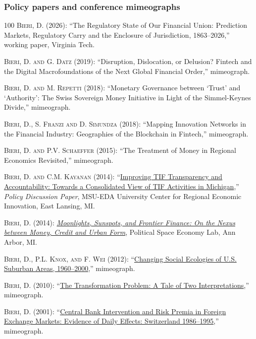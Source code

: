 \documentclass[letter,11pt]{article}
\begin{document}
\subsubsection*{Policy papers and conference mimeographs}
\begingroup
\renewcommand{\section}[2]{}
\begin{thebibliography}{100}
\textsc{Bieri, D.} (2026): \enquote{The Regulatory State of Our Financial Union: Prediction Markets, Regulatory Carry and the Enclosure of Jurisdiction, 1863--2026,} working paper, Virginia Tech.

\textsc{Bieri, D.  {\small and} G. Datz} (2019): \enquote{Disruption, Dislocation, or Delusion? Fintech and the Digital Macrofoundations of the Next Global Financial Order,} mimeograph.

\textsc{Bieri, D. {\small and} M. Repetti} (2018):
\noindent\enquote{Monetary Governance between \enquote{Trust} and \enquote{Authority}: The Swiss Sovereign Money Initiative in Light of the Simmel-Keynes Divide,} mimeograph.

\textsc{Bieri, D., S. Franzi  {\small and} D. Simundza} (2018): \enquote{Mapping Innovation Networks in the Financial Industry: Geographies of the Blockchain in Fintech,} mimeograph.

\textsc{Bieri, D. {\small and} P.V. Schaeffer} (2015):
\noindent\enquote{The Treatment of Money in Regional Economics Revisited,} mimeograph.

\textsc{Bieri, D. {\small and} C.M. Kayanan} (2014): \enquote{\href{http://papers.ssrn.com/sol3/papers.cfm?abstract_id=2476143}{Improving TIF Transparency and Accountability: Towards a Consolidated View of TIF Activities in Michigan},} \emph{Policy Discussion Paper}, MSU-EDA University Center for Regional Economic Innovation, East Lansing, MI.

\textsc{Bieri, D.} (2014): \href{https://david-bieri.com/legacy/docs/MSFF_PSELab_v0.pdf}{\emph{Moonlights, Sunspots, and Frontier Finance: On the Nexus between Money, Credit and Urban Form}}, Political Space Economy Lab, Ann Arbor, MI.

\textsc{Bieri, D., P.L. Knox,  {\small and} F. Wei} (2012): \enquote{\href{https://david-bieri.com/legacy/docs/SocialEcologies_BKW_Jun12.pdf}{Changing Social Ecologies of U.S. Suburban Areas, 1960--2000},} mimeograph.

\textsc{Bieri, D.} (2010): \enquote{\href{http://papers.ssrn.com/sol3/papers.cfm?abstract_id=989787}{The Transformation Problem: A Tale of Two Interpretations},} mimeograph.

\textsc{Bieri, D.} (2001): \enquote{\href{https://papers.ssrn.com/sol3/papers.cfm?abstract_id=2196017}{Central Bank Intervention and Risk Premia in Foreign Exchange Markets: Evidence of Daily Effects: Switzerland 1986--1995},} mimeograph.
\end{thebibliography}
\endgroup
\end{document}
